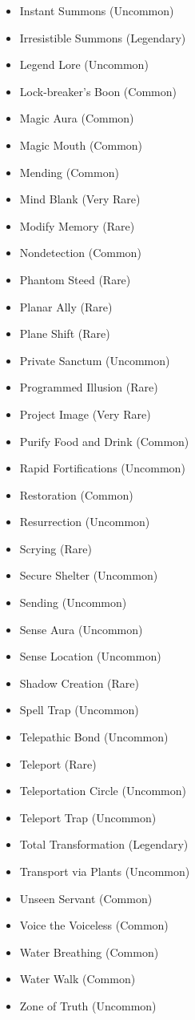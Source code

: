 \begin{itemize}
    \item Instant Summons (Uncommon)
    \item Irresistible Summons (Legendary)
    \item Legend Lore (Uncommon)
    \item Lock-breaker's Boon (Common)
    \item Magic Aura (Common)
    \item Magic Mouth (Common)
    \item Mending (Common)
    \item Mind Blank (Very Rare)
    \item Modify Memory (Rare)
    \item Nondetection (Common)
    \item Phantom Steed (Rare)
    \item Planar Ally (Rare)
    \item Plane Shift (Rare)
    \item Private Sanctum (Uncommon)
    \item Programmed Illusion (Rare)
    \item Project Image (Very Rare)
    \item Purify Food and Drink (Common)
    \item Rapid Fortifications (Uncommon)
    \item Restoration (Common)
    \item Resurrection (Uncommon)
    \item Scrying (Rare)
    \item Secure Shelter (Uncommon)
    \item Sending (Uncommon)
	\item Sense Aura (Uncommon)
    \item Sense Location (Uncommon)
    \item Shadow Creation (Rare)
    \item Spell Trap (Uncommon)
    \item Telepathic Bond (Uncommon)
    \item Teleport (Rare)
    \item Teleportation Circle (Uncommon)
    \item Teleport Trap (Uncommon)
    \item Total Transformation (Legendary)
    \item Transport via Plants (Uncommon)
    \item Unseen Servant (Common)
    \item Voice the Voiceless (Common)
    \item Water Breathing (Common)
    \item Water Walk (Common)
    \item Zone of Truth (Uncommon)
\end{itemize}

